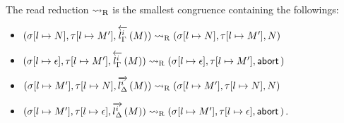 \begin{definition}
 \label{read}
 The read reduction $\rreduce$ is the smallest congruence
 containing the
 followings:
\begin{itemize}
 \item  $\conf{[l\mapsto {N}]}{[l\mapsto M']}{\rtol i l\Gamma M}\rreduce
	\conf{[l\mapsto {N}]}{[l\mapsto M']}{N}$
 \item  $\conf{[l\mapsto \epsilon]}
	{[l\mapsto M']}{\rtol i l\Gamma M}\rreduce
	\conf{[l\mapsto \epsilon]}{[l\mapsto M']}{\abort}$
 \item  $\conf{[l\mapsto M']}{[l\mapsto {N}]}{\ltor i l \Delta M}\rreduce
	\conf{[l\mapsto M']}{[l\mapsto {N}]}{N}$
 \item  $\conf{[l\mapsto M']}{[l\mapsto \epsilon]}{\ltor i l \Delta M}\rreduce
	 \conf{[l\mapsto M']}{[l\mapsto \epsilon]}{\abort}$\enspace .
\end{itemize}
\end{definition}

